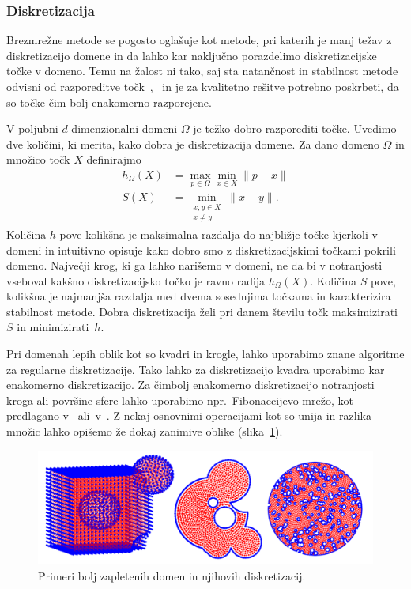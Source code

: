 \documentclass[12pt,a4paper,twoside]{article}
\theoremstyle{definition} %
\theoremstyle{plain} %
\numberwithin{equation}{section}
\begin{document}
\subsubsection{Diskretizacija}
Brezmrežne metode se pogosto oglašuje kot metode, pri katerih je manj težav z diskretizacijo domene
in da lahko kar naključno porazdelimo diskretizacijske točke v domeno. Temu na žalost ni tako,
saj sta natančnost in stabilnost metode odvisni od razporeditve
točk~\cite[slika~8]{kosec2016local},~\cite{amani2012mixed} in je za kvalitetno rešitve potrebno
poskrbeti, da so točke čim bolj enakomerno razporejene.

V poljubni $d$-dimenzionalni domeni $\Omega$ je težko dobro razporediti točke.
Uvedimo dve količini, ki merita, kako dobra je diskretizacija domene.
Za dano domeno $\Omega$ in množico točk $X$ definirajmo
\begin{align}
  h_\Omega(X) &= \max_{p \in \Omega} \min_{x \in X} \|p - x\| \\
  \label{eq:def-hs}
  S(X) &= \min_{\substack{x, y \in X \\ x \neq y}} \|x-y\|.
\end{align}
Količina $h$ pove kolikšna je maksimalna razdalja do najbližje točke kjerkoli v domeni in intuitivno
opisuje kako dobro smo z diskretizacijskimi točkami pokrili domeno. Največji krog, ki ga lahko
narišemo v domeni, ne da bi v notranjosti vseboval kakšno diskretizacijsko točko je ravno radija
$h_\Omega(X)$. Količina $S$ pove, kolikšna je najmanjša razdalja med dvema sosednjima točkama in
karakterizira stabilnost metode. Dobra diskretizacija želi pri danem številu točk maksimizirati $S$
in minimizirati~$h$.

Pri domenah lepih oblik kot so kvadri in krogle, lahko uporabimo znane algoritme za regularne
diskretizacije.  Tako lahko za diskretizacijo kvadra uporabimo kar enakomerno diskretizacijo.  Za
čimbolj enakomerno diskretizacijo notranjosti kroga ali površine sfere lahko uporabimo
npr.~Fibonaccijevo mrežo, kot predlagano v~\cite{hannay2004fibonacci}
ali~v~\cite{gonzalez2010measurement}.
Z nekaj osnovnimi operacijami kot so unija in razlika množic lahko opišemo že dokaj zanimive oblike
(slika~\ref{fig:domains}).

\begin{figure}[!ht]
  \centering
  \includegraphics[width=\textwidth]{images/domains_generated.png}
  \caption{Primeri bolj zapletenih domen in njihovih diskretizacij.}
  \label{fig:domains}
\end{figure}
\end{document}
